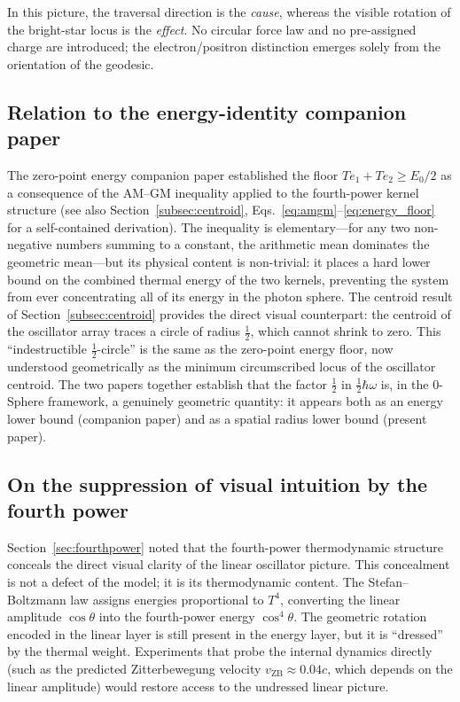 \documentclass[%
 reprint, amsmath,amssymb, aps, prb, ]{revtex4-2}
\numberwithin{equation}{section}
\newcommand{\iphase}{\theta}
\begin{document}
In this picture, the traversal direction is the \emph{cause}, whereas the visible rotation of the bright-star locus is the \emph{effect}. No circular force law and no pre-assigned charge are introduced; the electron/positron distinction emerges solely from the orientation of the geodesic.

\subsection{Relation to the energy-identity companion paper}

The zero-point energy companion paper \cite{hanamura46} established the floor $Te_1 + Te_2 \geq E_0/2$ as a consequence of the AM--GM inequality applied to the fourth-power kernel structure (see also Section~\ref{subsec:centroid}, Eqs.~\eqref{eq:amgm}--\eqref{eq:energy_floor} for a self-contained derivation). The inequality is elementary---for any two non-negative numbers summing to a constant, the arithmetic mean dominates the geometric mean---but its physical content is non-trivial: it places a hard lower bound on the combined thermal energy of the two kernels, preventing the system from ever concentrating all of its energy in the photon sphere. The centroid result of Section~\ref{subsec:centroid} provides the direct visual counterpart: the centroid of the oscillator array traces a circle of radius $\tfrac{1}{2}$, which cannot shrink to zero. This ``indestructible $\tfrac{1}{2}$-circle'' is the same as the zero-point energy floor, now understood geometrically as the minimum circumscribed locus of the oscillator centroid. The two papers together establish that the factor $\tfrac{1}{2}$ in $\tfrac{1}{2}\hbar\omega$ is, in the 0-Sphere framework, a genuinely geometric quantity: it appears both as an energy lower bound (companion paper) and as a spatial radius lower bound (present paper).

\subsection{On the suppression of visual intuition by the fourth power}

Section~\ref{sec:fourthpower} noted that the fourth-power thermodynamic structure conceals the direct visual clarity of the linear oscillator picture. This concealment is not a defect of the model; it is its thermodynamic content. The Stefan--Boltzmann law assigns energies proportional to $T^4$, converting the linear amplitude $\cos\iphase$ into the fourth-power energy $\cos^4\iphase$. The geometric rotation encoded in the linear layer is still present in the energy layer, but it is ``dressed'' by the thermal weight. Experiments that probe the internal dynamics directly (such as the predicted Zitterbewegung velocity $v_{\text{ZB}} \approx 0.04c$, which depends on the linear amplitude) would restore access to the undressed linear picture.
\end{document}
